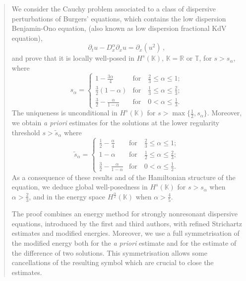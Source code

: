 \documentclass{amsart}
\theoremstyle{definition}
\theoremstyle{remark}
\numberwithin{equation}{section}
\begin{document}
\begin{abstract} 
We consider the Cauchy problem associated to a class of dispersive perturbations of Burgers' equations, which contains the low dispersion Benjamin-Ono equation, (also known as low dispersion fractional KdV equation),
$$ \partial_tu-D_x^{\alpha}\partial_xu=\partial_x(u^2) \, ,$$ 
and prove that it is locally well-posed in $H^s(\mathbb K)$, $\mathbb K=\mathbb R$ or $\mathbb T$, for $s>s_{\alpha}$, where 
\begin{equation*}
s_\alpha=\begin{cases}
 1-\frac{3\alpha}4 & \text{for} \quad \frac23 \le \alpha \le 1; \\ 
  \frac 32(1-\alpha) &  \text{for}  \quad \frac13 \le \alpha \le \frac23; \\ 
 \frac 32-\frac{\alpha}{1-\alpha}  & \text{for} \quad 0 < \alpha  \le \frac13 .
 \end{cases}
\end{equation*} 
The uniqueness is unconditional in $H^s(\mathbb K)$ for $s>\max\{\frac12,s_{\alpha}\}$. Moreover, we obtain \emph{a priori} estimates for the solutions at the lower regularity threshold $s>\widetilde{s}_\alpha$ where
\begin{equation*}
\widetilde{s}_\alpha=\begin{cases}
 \frac 12-\frac \alpha 4 & \text{for} \quad \frac23 \le \alpha \le 1; \\ 
  1-\alpha &  \text{for}  \quad \frac12 \le \alpha \le \frac23; \\ 
 \frac 32-\frac{\alpha}{1-\alpha}  & \text{for} \quad 0 < \alpha  \le \frac12 .
 \end{cases}
\end{equation*}
As a consequence of these results and of the Hamiltonian structure of the equation, we deduce global well-posedness in $H^s(\mathbb K)$ for $s>s_{\alpha}$ when $\alpha>\frac23$, and in the energy space $H^{\frac{\alpha}2}(\mathbb K)$ when  $\alpha>\frac45$.

The proof combines an energy method for strongly nonresonant dispersive equations, introduced by the first and third authors, with refined Strichartz estimates and modified energies. Moreover, we use a full symmetrisation of the modified energy both for the \textit{a priori} estimate and for the estimate of the difference of two solutions. This symmetrisation allows some cancellations of the resulting symbol which are crucial to close the estimates. 
\end{abstract}
\end{document}
